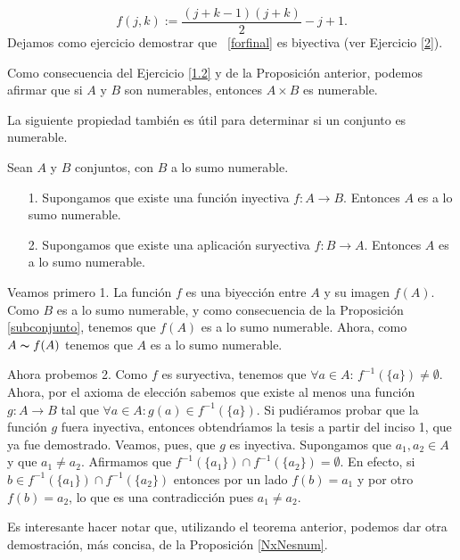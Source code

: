 \begin{demo}
\begin{equation}\label{forfinal}
f(j,k):=\frac{(j+k-1)(j+k)}{2}-j+1.
\end{equation}
Dejamos como ejercicio  demostrar que ~\eqref{forfinal} es
biyectiva (ver Ejercicio \vref{2}).
\end{demo}

Como consecuencia del Ejercicio \vref{1.2} y de la Proposici\'on
anterior, podemos afirmar que si $A$ y $B$ son numerables,
entonces $A\times B$ es numerable.



La siguiente propiedad tambi\'en es \'util para determinar si un
conjunto es numerable.

\begin{proposicion}\label{numinysur}Sean $A$ y $B$ conjuntos, con $B$ a lo sumo
numerable.
\begin{itemize}
\item[1.] Supongamos que existe una funci\'on inyectiva $f:A\longrightarrow
B$. Entonces $A$ es a lo sumo numerable.
\item[2.] Supongamos que existe una aplicaci\'on suryectiva
$f:B\longrightarrow A$. Entonces $A$ es a lo sumo numerable.
\end{itemize}
\end{proposicion}
\begin{demo} Veamos primero 1. La funci\'on $f$ es  una biyecci\'on entre $A$ y su
imagen $f(A)$. Como $B$ es a lo sumo numerable,  y como
consecuencia de la Proposici\'on \vref{subconjunto}, tenemos que
$f(A)$ es a lo sumo numerable. Ahora, como $A\thicksim f(A)$
tenemos que $A$ es a lo sumo numerable.

Ahora probemos 2. Como $f$ es suryectiva, tenemos que $\forall
a\in A$: $f^{-1}(\{a\})\neq\emptyset$. Ahora, por el axioma de
elecci\'on sabemos que existe al menos una funci\'on
$g:A\longrightarrow B$ tal que $\forall a\in A:g(a)\in
f^{-1}(\{a\})$. Si pudi\'eramos probar que la funci\'on $g$ fuera
inyectiva, entonces obtendr\'{\i}amos la tesis a partir del inciso
1, que ya fue demostrado. Veamos, pues, que $g$ es inyectiva.
Supongamos que $a_1,a_2\in A$ y que $a_1\neq a_2$. Afirmamos que
$f^{-1}(\{a_1\})\cap f^{-1}(\{a_2\})=\emptyset$. En efecto, si
$b\in f^{-1}(\{a_1\})\cap f^{-1}(\{a_2\})$ entonces por un lado
 $f(b)=a_1$ y por otro $f(b)=a_2$, lo que es una contradicci\'on pues $a_1\neq a_2$.
\end{demo}

Es interesante hacer notar que, utilizando el teorema anterior,
podemos dar otra demostraci\'on, m\'as concisa, de la
Proposici\'on \vref{NxNesnum}.

